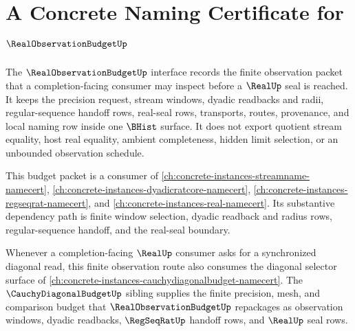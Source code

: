 \chapter{A Concrete Naming Certificate for $\RealObservationBudgetUp$}
\label{ch:concrete-instances-real-observation-budget-namecert}

The $\RealObservationBudgetUp$ interface records the finite observation packet that a completion-facing consumer may inspect before a $\RealUp$ seal is reached. It keeps the precision request, stream windows, dyadic readbacks and radii, regular-sequence handoff rows, real-seal rows, transports, routes, provenance, and local naming row inside one $\BHist$ surface. It does not export quotient stream equality, host real equality, ambient completeness, hidden limit selection, or an unbounded observation schedule.

This budget packet is a consumer of \autoref{ch:concrete-instances-streamname-namecert}, \autoref{ch:concrete-instances-dyadicratcore-namecert}, \autoref{ch:concrete-instances-regseqrat-namecert}, and \autoref{ch:concrete-instances-real-namecert}. Its substantive dependency path is finite window selection, dyadic readback and radius rows, regular-sequence handoff, and the real-seal boundary.

Whenever a completion-facing $\RealUp$ consumer asks for a synchronized diagonal read, this finite observation route also consumes the diagonal selector surface of \autoref{ch:concrete-instances-cauchydiagonalbudget-namecert}. The $\CauchyDiagonalBudgetUp$ sibling supplies the finite precision, mesh, and comparison budget that $\RealObservationBudgetUp$ repackages as observation windows, dyadic readbacks, $\RegSeqRatUp$ handoff rows, and $\RealUp$ seal rows.

